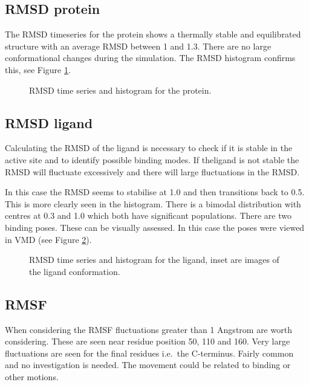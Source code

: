 \documentclass[twocolumn]{bmcart}%
\def\texttt{[image: ]}
\begin{document}
\subsection*{RMSD protein}
The RMSD timeseries for the protein shows a thermally stable and equilibrated structure with
an average RMSD between 1 and 1.3. There are no large conformational changes during the simulation. The RMSD histogram confirms this, see Figure \ref{fig:rmsdprotein}. 

\begin{figure}[h!]
  \caption{
      RMSD time series and histogram for the protein.}
\label{fig:rmsdprotein}
      \end{figure}

\subsection*{RMSD ligand}
Calculating the RMSD of the ligand is necessary to check if it is stable in the active site and to identify possible binding modes. If theligand is not stable the RMSD will fluctuate excessively and there will
large fluctuations in the RMSD.

In this case the RMSD seems to stabilise at 1.0 and then transitions back to 0.5. This is more clearly seen in the histogram. There is a bimodal distribution with centres at 0.3 and 1.0 which both have significant populations. There are two binding poses. These can be visually assessed. In this case the
poses were viewed in VMD \cite{hump_vmd_1996} (see Figure \ref{fig:rmsdligand}).

\begin{figure}[h!]
  \caption{
      RMSD time series and histogram for the ligand, inset are images of the ligand conformation.}
\label{fig:rmsdligand}
      \end{figure}

\subsection*{RMSF}
When considering the RMSF fluctuations greater than 1 Angstrom are worth
considering. These are seen near residue position 50, 110 and 160. Very
large fluctuations are seen for the final residues i.e.~the C-terminus.
Fairly common and no investigation is needed. The movement could be
related to binding or other motions.
\end{document}
